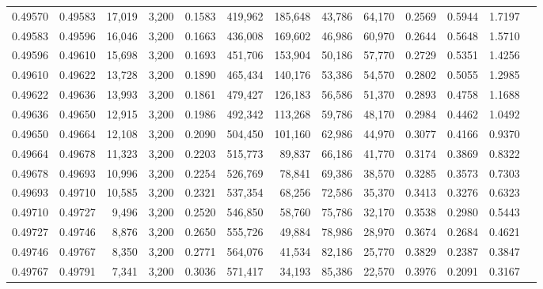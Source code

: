 \begin{tabular}{rrrrrrrrrrrrr}
0.49570 & 0.49583 & 17,019 & 3,200 &                                     0.1583 & 419,962 & 185,648 &  43,786 &  64,170 & 0.2569 & 0.5944 & 1.7197 \\
0.49583 & 0.49596 & 16,046 & 3,200 &                                     0.1663 & 436,008 & 169,602 &  46,986 &  60,970 & 0.2644 & 0.5648 & 1.5710 \\
0.49596 & 0.49610 & 15,698 & 3,200 &                                     0.1693 & 451,706 & 153,904 &  50,186 &  57,770 & 0.2729 & 0.5351 & 1.4256 \\
0.49610 & 0.49622 & 13,728 & 3,200 &                                     0.1890 & 465,434 & 140,176 &  53,386 &  54,570 & 0.2802 & 0.5055 & 1.2985 \\
0.49622 & 0.49636 & 13,993 & 3,200 &                                     0.1861 & 479,427 & 126,183 &  56,586 &  51,370 & 0.2893 & 0.4758 & 1.1688 \\
0.49636 & 0.49650 & 12,915 & 3,200 &                                     0.1986 & 492,342 & 113,268 &  59,786 &  48,170 & 0.2984 & 0.4462 & 1.0492 \\
0.49650 & 0.49664 & 12,108 & 3,200 &                                     0.2090 & 504,450 & 101,160 &  62,986 &  44,970 & 0.3077 & 0.4166 & 0.9370 \\
0.49664 & 0.49678 & 11,323 & 3,200 &                                     0.2203 & 515,773 &  89,837 &  66,186 &  41,770 & 0.3174 & 0.3869 & 0.8322 \\
0.49678 & 0.49693 & 10,996 & 3,200 &                                     0.2254 & 526,769 &  78,841 &  69,386 &  38,570 & 0.3285 & 0.3573 & 0.7303 \\
0.49693 & 0.49710 & 10,585 & 3,200 &                                     0.2321 & 537,354 &  68,256 &  72,586 &  35,370 & 0.3413 & 0.3276 & 0.6323 \\
0.49710 & 0.49727 &  9,496 & 3,200 &                                     0.2520 & 546,850 &  58,760 &  75,786 &  32,170 & 0.3538 & 0.2980 & 0.5443 \\
0.49727 & 0.49746 &  8,876 & 3,200 &                                     0.2650 & 555,726 &  49,884 &  78,986 &  28,970 & 0.3674 & 0.2684 & 0.4621 \\
0.49746 & 0.49767 &  8,350 & 3,200 &                                     0.2771 & 564,076 &  41,534 &  82,186 &  25,770 & 0.3829 & 0.2387 & 0.3847 \\
0.49767 & 0.49791 &  7,341 & 3,200 &                                     0.3036 & 571,417 &  34,193 &  85,386 &  22,570 & 0.3976 & 0.2091 & 0.3167 \\

\end{tabular}
